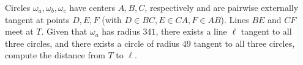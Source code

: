 Circles $\omega_a, \omega_b, \omega_c$ have centers $A, B, C$,  respectively and are pairwise externally tangent at points $D, E, F$ (with $D\in BC, E\in CA, F\in AB$). Lines $BE$ and $CF$ meet at $T$. Given that $\omega_a$ has radius $341$,  there exists a line $\ell$ tangent to all three circles, and there exists a circle of radius $49$ tangent to all three circles, compute the distance from $T$ to $\ell$.